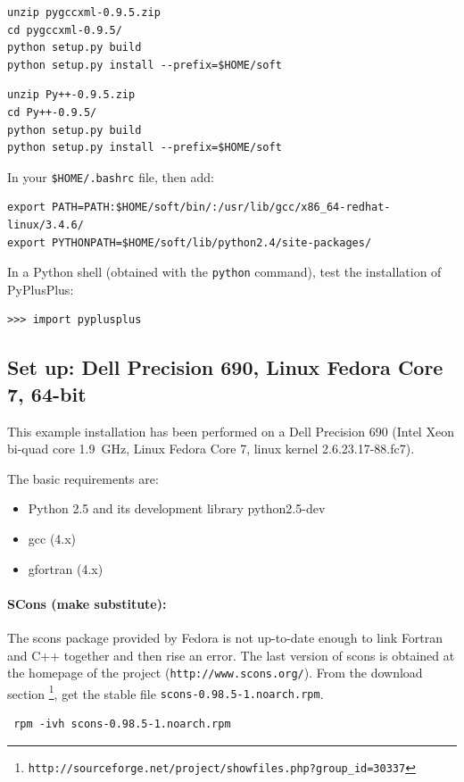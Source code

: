 \documentclass[12pt,a4paper]{article}
\begin{document}
\begin{verbatim}
unzip pygccxml-0.9.5.zip
cd pygccxml-0.9.5/
python setup.py build
python setup.py install --prefix=$HOME/soft
\end{verbatim}

\begin{verbatim}
unzip Py++-0.9.5.zip 
cd Py++-0.9.5/
python setup.py build
python setup.py install --prefix=$HOME/soft
\end{verbatim}

In your {\tt \$HOME/.bashrc} file, then add:
\begin{verbatim}
export PATH=PATH:$HOME/soft/bin/:/usr/lib/gcc/x86_64-redhat-linux/3.4.6/
export PYTHONPATH=$HOME/soft/lib/python2.4/site-packages/
\end{verbatim}

In a Python shell (obtained with the {\tt python} command), test the installation
of PyPlusPlus:
\begin{verbatim}
>>> import pyplusplus
\end{verbatim}

\subsection{Set up: Dell Precision 690, Linux Fedora Core 7, 64-bit}
This example installation has been performed on a Dell Precision 690 (Intel
Xeon bi-quad core 1.9~GHz, Linux Fedora Core 7, linux kernel 2.6.23.17-88.fc7).

The basic requirements are:
\begin{itemize}
\item Python 2.5 and its development library python2.5-dev
\item gcc (4.x)
\item gfortran (4.x)
\end{itemize}

\paragraph{SCons (make substitute):}
The scons package provided by Fedora is not up-to-date enough to link Fortran and C++ together and then rise an
error. The last version of scons is obtained at the homepage of the project ({\tt  http://www.scons.org/}).
From the download section \footnote{\tt http://sourceforge.net/project/showfiles.php?group\_id=30337}, 
get the stable file {\tt scons-0.98.5-1.noarch.rpm}.

\begin{verbatim}
 rpm -ivh scons-0.98.5-1.noarch.rpm
\end{verbatim}
\end{document}
